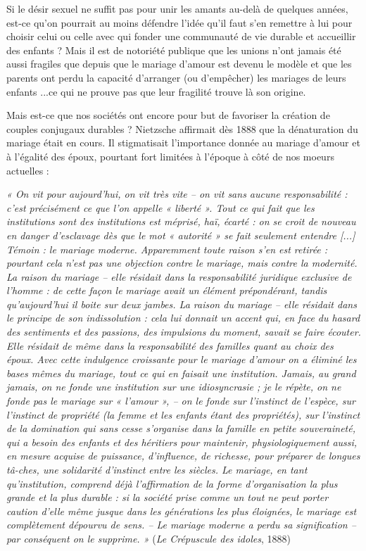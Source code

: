 Si le désir sexuel ne suffit pas pour unir les amants au-delà de quelques années, est-ce qu'on pourrait au moins défendre l'idée qu'il faut s'en remettre à lui pour choisir celui ou celle avec qui fonder une communauté de vie durable et accueillir des enfants ? Mais il est de notoriété publique que les unions n'ont jamais été aussi fragiles que depuis que le mariage d’amour est devenu le modèle et que les parents ont perdu la capacité d’arranger (ou d'empêcher) les mariages de leurs enfants ...ce qui ne prouve pas que leur fragilité trouve là son origine.


Mais est-ce que nos sociétés ont encore pour but de favoriser la création de couples conjugaux durables ? Nietzsche affirmait dès 1888 que la dénaturation du mariage était en cours. Il stigmatisait l'importance donnée au mariage d'amour et à l'égalité des époux, pourtant fort limitées à l'époque à côté de nos moeurs actuelles :
\begin{displayquote}
\emph{« On vit pour aujourd'hui, on vit très vite -- on vit sans aucune responsabilité : c'est précisément ce que l'on appelle « liberté ». Tout ce qui fait que les institutions sont des institutions est méprisé, haï, écarté : on se croit de nouveau en danger d'esclavage dès que le mot « autorité » se fait seulement entendre [...] Témoin : le mariage moderne. Apparemment toute raison s'en est retirée : pourtant cela n'est pas une objection contre le mariage, mais contre la modernité. La raison du mariage -- elle résidait dans la responsabilité juridique exclusive de l'homme : de cette façon le mariage avait un élément prépondérant, tandis qu'aujourd'hui il boite sur deux jambes. La raison du mariage -- elle résidait dans le principe de son indissolution : cela lui donnait un accent qui, en face du hasard des sentiments et des passions, des impulsions du moment, savait se faire écouter. Elle résidait de même dans la responsabilité des familles quant au choix des époux. Avec cette indulgence croissante pour le mariage d'amour on a éliminé les bases mêmes du mariage, tout ce qui en faisait une institution. Jamais, au grand jamais, on ne fonde une institution sur une idiosyncrasie ; je le répète, on ne fonde pas le mariage sur « l'amour », -- on le fonde sur l'instinct de l'espèce, sur l'instinct de propriété (la femme et les enfants étant des propriétés), sur l'instinct de la domination qui sans cesse s'organise dans la famille en petite souveraineté, qui a besoin des enfants et des héritiers pour maintenir, physiologiquement aussi, en mesure acquise de puissance, d'influence, de richesse, pour préparer de longues tâ-ches, une solidarité d'instinct entre les siècles. Le mariage, en tant qu'institution, comprend déjà l'affirmation de la forme d'organisation la plus grande et la plus durable : si la société prise comme un tout ne peut porter caution d'elle même jusque dans les générations les plus éloignées, le mariage est complètement dépourvu de sens. -- Le mariage moderne a perdu sa signification -- par conséquent on le supprime. »} (\emph{Le Crépuscule des idoles}, 1888) 
\end{displayquote}

